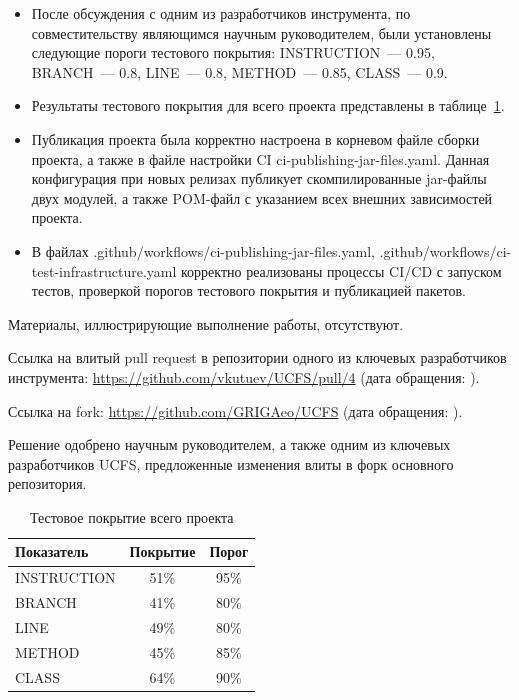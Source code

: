 \documentclass[a4paper]{article}
\begin{document}
\begin{itemize}
    \item После обсуждения с одним из разработчиков инструмента, по совместительству являющимся научным руководителем, были установлены следующие пороги тестового покрытия: INSTRUCTION~--- 0.95, BRANCH~--- 0.8, LINE~--- 0.8, METHOD~--- 0.85, CLASS~--- 0.9.
    \item Результаты тестового покрытия для всего проекта представлены в таблице~\ref{tab:solver-coverage}.
    \item Публикация проекта была корректно настроена в корневом файле сборки проекта, а также в файле настройки CI ci-publishing-jar-files.yaml. Данная конфигурация при новых релизах публикует скомпилированные jar-файлы двух модулей, а также POM-файл с указанием всех внешних зависимостей проекта.
    \item В файлах .github/workflows/ci-publishing-jar-files.yaml, .github/workflows/ci-test-infrastructure.yaml корректно реализованы процессы CI/CD с запуском тестов, проверкой порогов тестового покрытия и публикацией пакетов. 
\end{itemize}

Материалы, иллюстрирующие выполнение работы, отсутствуют.

Ссылка на влитый pull request в репозитории одного из ключевых разработчиков инструмента: \url{https://github.com/vkutuev/UCFS/pull/4} (дата обращения: ).

Ссылка на fork: \url{https://github.com/GRIGAeo/UCFS} (дата обращения: ).

Решение одобрено научным руководителем, а также одним из ключевых разработчиков UCFS, предложенные изменения влиты в форк основного репозитория.

\begin{table}[H]
\centering
\begin{tabular}{|l|c|c|}
\hline
Показатель & Покрытие & Порог \\
\hline
INSTRUCTION & 51\% & 95\% \\
BRANCH      & 41\% & 80\% \\
LINE        & 49\% & 80\% \\
METHOD      & 45\% & 85\% \\
CLASS       & 64\% & 90\% \\
\hline
\end{tabular}
\caption{Тестовое покрытие всего проекта}
\label{tab:solver-coverage}
\end{table}
\end{document}

